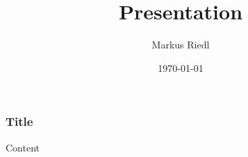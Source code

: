 \documentclass[firafont]{beamer-acib-theme/biotop}
\title{Presentation}
\author{Markus Riedl}
\date{\today}
\institute{BOKU}
\begin{document}
\begin{frame}[plain,label=title]
  \titlepage
\end{frame}


\begin{frame}
  \frametitle{Title}

  Content

\end{frame}

\end{document}
